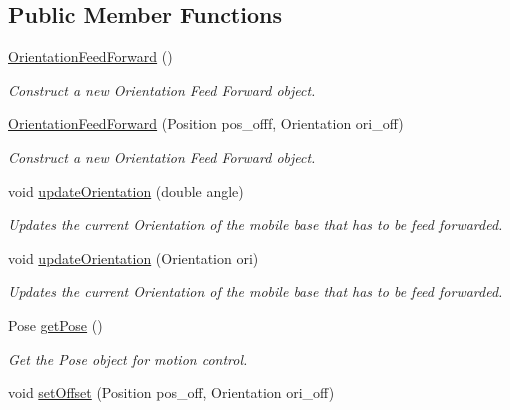 \subsection*{Public Member Functions}
\begin{DoxyCompactItemize}
\item 
\mbox{\label{classOrientationFeedForward_aad82bda1b9fa824e321a6c8afad84973}} 
\hyperlink{classOrientationFeedForward_aad82bda1b9fa824e321a6c8afad84973}{Orientation\+Feed\+Forward} ()
\begin{DoxyCompactList}\small\item\em Construct a new Orientation Feed Forward object. \end{DoxyCompactList}\item 
\hyperlink{classOrientationFeedForward_a0ae1aba3b3e0abf84828a9db008b6f69}{Orientation\+Feed\+Forward} (Position pos\+\_\+offf, Orientation ori\+\_\+off)
\begin{DoxyCompactList}\small\item\em Construct a new Orientation Feed Forward object. \end{DoxyCompactList}\item 
void \hyperlink{classOrientationFeedForward_aa7d8913f8f9d90e913b478d9adc5ff20}{update\+Orientation} (double angle)
\begin{DoxyCompactList}\small\item\em Updates the current Orientation of the mobile base that has to be feed forwarded. \end{DoxyCompactList}\item 
void \hyperlink{classOrientationFeedForward_aed8f826976135c0cd55408a652993828}{update\+Orientation} (Orientation ori)
\begin{DoxyCompactList}\small\item\em Updates the current Orientation of the mobile base that has to be feed forwarded. \end{DoxyCompactList}\item 
Pose \hyperlink{classOrientationFeedForward_ad31fce2cdf39cbf375457b9aa7ca2219}{get\+Pose} ()
\begin{DoxyCompactList}\small\item\em Get the Pose object for motion control. \end{DoxyCompactList}\item 
void \hyperlink{classOrientationFeedForward_adc105d9a1fe00d6a79fcf38447202709}{set\+Offset} (Position pos\+\_\+off, Orientation ori\+\_\+off)

\end{DoxyCompactItemize}
